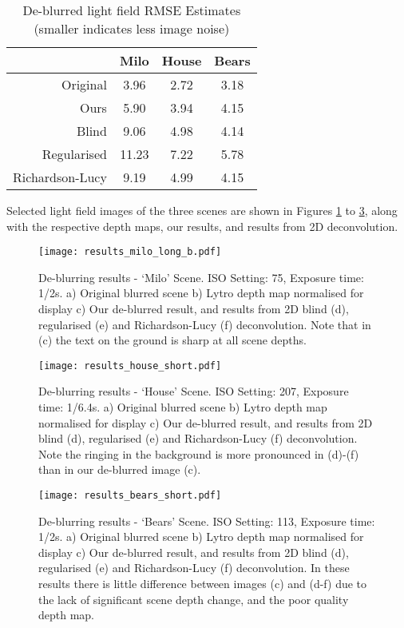 \begin{table}[h]
\centering
\caption[De-blurred light field RMSE Estimates]{De-blurred light field RMSE Estimates (smaller indicates less image noise)}
\label{tab:deblurred_light_field_rmse_estimates}
\begin{tabular}[h]{r | c c c}
                & Milo  & House & Bears \\
\hline
Original        & 3.96  & 2.72 & 3.18 \\
Ours            & 5.90  & 3.94 & 4.15 \\
Blind           & 9.06  & 4.98 & 4.14 \\
Regularised     & 11.23 & 7.22 & 5.78 \\
Richardson-Lucy & 9.19  & 4.99 & 4.15 \\
\end{tabular}
\end{table}


Selected light field images of the three scenes are shown in Figures \ref{fig:results_milo_long_b} to \ref{fig:results_bears_short}, along with the respective depth maps, our results, and results from 2D deconvolution.



\begin{figure}[h]
\centering
\texttt{[image: results\_milo\_long\_b.pdf]}
\caption[De-blurring results - \enquote*{Milo} Scene]{
De-blurring results - \enquote*{Milo} Scene.
ISO Setting: 75, Exposure time: 1/2s.
a) Original blurred scene b) Lytro depth map normalised for display c) Our de-blurred result, and results from 2D blind (d), regularised (e) and Richardson-Lucy (f) deconvolution.
Note that in (c) the text on the ground is sharp at all scene depths.
}
\label{fig:results_milo_long_b}
\end{figure}

\begin{figure}[h]
\centering
\texttt{[image: results\_house\_short.pdf]}
\caption[De-blurring results - \enquote*{House} Scene]{
De-blurring results - \enquote*{House} Scene.
ISO Setting: 207, Exposure time: 1/6.4s.
a) Original blurred scene b) Lytro depth map normalised for display c) Our de-blurred result, and results from 2D blind (d), regularised (e) and Richardson-Lucy (f) deconvolution.
Note the ringing in the background is more pronounced in (d)-(f) than in our de-blurred image (c).
}
\label{fig:results_house_short}
\end{figure}

\begin{figure}[h]
\centering
\texttt{[image: results\_bears\_short.pdf]}
\caption[De-blurring results - \enquote*{Bears} Scene]{
De-blurring results - \enquote*{Bears} Scene.
ISO Setting: 113, Exposure time: 1/2s.
a) Original blurred scene b) Lytro depth map normalised for display c) Our de-blurred result, and results from 2D blind (d), regularised (e) and Richardson-Lucy (f) deconvolution.
In these results there is little difference between images (c) and (d-f) due to the lack of significant scene depth change, and the poor quality depth map.
}
\label{fig:results_bears_short}
\end{figure}




